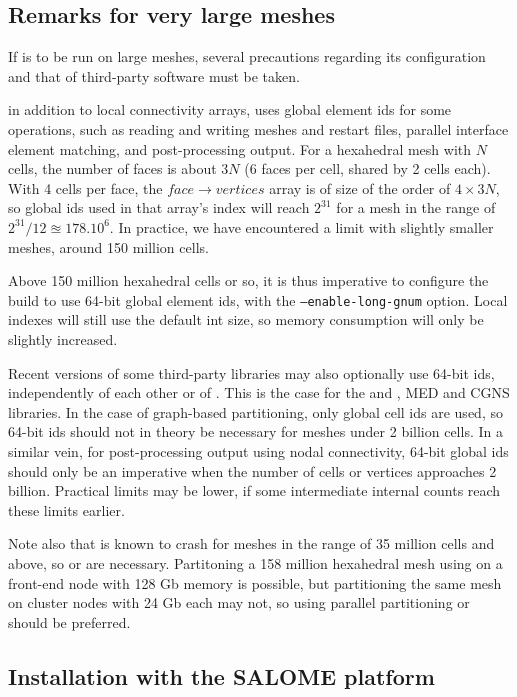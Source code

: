 \documentclass[a4paper,10pt,twoside]{csshortdoc}
\begin{document}
\subsection{Remarks for very large meshes\label{sec:config:largemesh}}

If \CS is to be run on large meshes, several precautions regarding
its configuration and that of third-party software must be taken.

in addition to local connectivity arrays, \CS uses global element ids
for some operations, such as reading and writing meshes and restart files,
parallel interface element matching, and post-processing output.
For a hexahedral mesh with $N$ cells,
the number of faces is about $3N$ (6 faces per cell, shared by 2 cells each).
With 4 cells per face, the $face \rightarrow vertices$ array is of size
of the order of $4\times3N$, so global ids used in that array's index
will reach $2^{31}$ for a mesh in the range of $2^{31} / 12 \approxeq 178.10^6$.
In practice, we have encountered a limit with slightly smaller meshes,
around 150 million cells.

Above 150 million hexahedral cells or so, it is thus imperative to configure
the build to use 64-bit global element ids, with the
{\tt --enable-long-gnum} option. Local indexes will still use
the default {int} size, so memory consumption will only be slightly
increased.

Recent versions of some third-party libraries may also optionally use 64-bit ids,
independently of each other or of \CS.
This is the case for the \scotch and \metis, MED and
CGNS libraries. In the case of graph-based partitioning, only
global cell ids are used, so 64-bit ids should not in theory be necessary
for meshes under 2 billion cells. In a similar vein, for post-processing output
using nodal connectivity, 64-bit global ids should only be an imperative
when the number of cells or vertices approaches 2 billion.
Practical limits may be lower, if some intermediate internal counts
reach these limits earlier.

Note also that  is known to crash for meshes in the range of
35 million cells and above, so  or \scotch are necessary.
Partitoning a 158 million hexahedral mesh using 
on a front-end node with 128 Gb memory is possible,
but partitioning the same mesh on cluster nodes with 24 Gb each
may not, so using parallel partitioning \ptscotch or \parmetis
should be preferred.

\subsection{Installation with the SALOME platform\label{sec:config:salome}}
\end{document}
